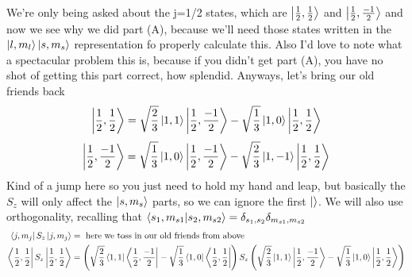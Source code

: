 \documentclass{article}
\begin{document}
\begin{enumerate}[label=\alph*)]
\[	\]
	We're only being asked about the j=1/2 states, which are $\ket{\frac{1}{2}, \frac{1}{2}}$ and $\ket{\frac{1}{2}, \frac{-1}{2}}$ and now we see why we did part (A), because we'll need those states written in the $\ket{l, m_l}\ket{s, m_s}$ representation fo properly calculate this. Also I'd love to note what a spectacular problem this is, because if you didn't get part (A), you have no shot of getting this part correct, how splendid. Anyways, let's bring our old friends back
	\[ \ket{\frac{1}{2}, \frac{1}{2}} = \sqrt{\frac{2}{3}} \ket{1, 1}\ket{\frac{1}{2}, \frac{-1}{2}} - \sqrt{\frac{1}{3}}\ket{1, 0}\ket{\frac{1}{2}, \frac{1}{2}} \]
	\[ \ket{\frac{1}{2}, \frac{-1}{2}} = \sqrt{\frac{1}{3}}\ket{1, 0}\ket{\frac{1}{2}, \frac{-1}{2}} - \sqrt{\frac{2}{3}} \ket{1, -1}\ket{\frac{1}{2}, \frac{1}{2}}\]
	Kind of a jump here so you just need to hold my hand and leap, but basically the $S_z$ will only affect the $\ket{s, m_s}$ parts, so we can ignore the first $\ket{}$. We will also use orthogonality, recalling that $\bra{s_1, m_{s1}}\ket{s_2, m_{s2}} = \delta_{s_1,s_2}\delta_{m_{s1},m_{s2}} $
	\begin{align*}
		\bra{j, m_j}S_z\ket{j, m_j} &= \text{ here we toss in our old friends from above} \\ 
		\bra{\frac{1}{2},\frac{1}{2}}S_z\ket{\frac{1}{2},\frac{1}{2}} &= \left(\sqrt{\frac{2}{3}} \bra{1, 1}\bra{\frac{1}{2}, \frac{-1}{2}} - \sqrt{\frac{1}{3}}\bra{1, 0}\bra{\frac{1}{2}, \frac{1}{2}}\right)S_z \left(\sqrt{\frac{2}{3}} \ket{1, 1}\ket{\frac{1}{2}, \frac{-1}{2}} - \sqrt{\frac{1}{3}}\ket{1, 0}\ket{\frac{1}{2}, \frac{1}{2}} \right) \\

\end{align*}
\end{enumerate}
\end{document}
